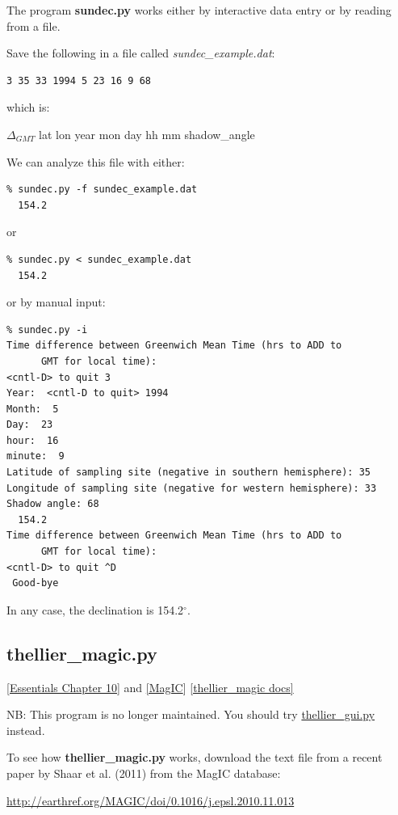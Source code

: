 \documentclass[11pt]{book}
\begin{document}
{The program {\bf sundec.py}  works either by interactive data entry or by reading from a file.

Save the following in a file called {\it sundec\_example.dat}:

\begin{verbatim}
3 35 33 1994 5 23 16 9 68
\end{verbatim}
which is:

$\Delta_{GMT}$ lat lon year mon day hh mm shadow\_angle

We can analyze this file with either:

\begin{verbatim}
% sundec.py -f sundec_example.dat
  154.2
\end{verbatim}
or
\begin{verbatim}
% sundec.py < sundec_example.dat
  154.2
\end{verbatim}
or by manual input:
\begin{verbatim}
% sundec.py -i
Time difference between Greenwich Mean Time (hrs to ADD to
      GMT for local time):
<cntl-D> to quit 3
Year:  <cntl-D to quit> 1994
Month:  5
Day:  23
hour:  16
minute:  9
Latitude of sampling site (negative in southern hemisphere): 35
Longitude of sampling site (negative for western hemisphere): 33
Shadow angle: 68
  154.2
Time difference between Greenwich Mean Time (hrs to ADD to
      GMT for local time):
<cntl-D> to quit ^D
 Good-bye

\end{verbatim}

In any case, the declination is 154.2$^{\circ}$.


\subsection{thellier\_magic.py}
\href{http://earthref.org/MAGIC/books/Tauxe/Essentials/WebBook3ch10.html#ch10}{ [Essentials Chapter 10]} and \href{#MagIC}{[MagIC}]
\href{https://github.com/PmagPy/PmagPy/blob/master/programs/thellier_magic.py}{[thellier\_magic docs]}

NB:  This program is no longer maintained.  You should try \href{#thellier_GUI.py}{thellier\_gui.py} instead.

To see how {\bf thellier\_magic.py}  works, download the text file from a recent paper by Shaar et al. (2011) from the MagIC database:

\nocite{shaar11}
\url{http://earthref.org/MAGIC/doi/0.1016/j.epsl.2010.11.013}

}
\end{document}
